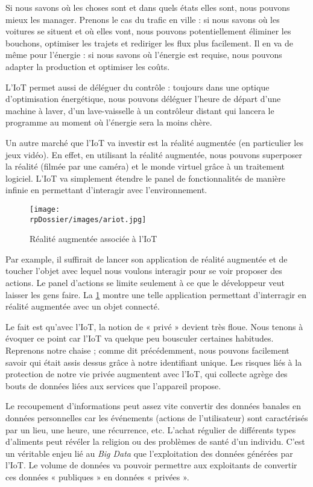 Si nous savons où les choses sont et dans quels états elles sont, nous pouvons mieux les manager. Prenons le cas du trafic en ville : si nous savons où les voitures se situent et où elles vont, nous pouvons potentiellement éliminer les bouchons, optimiser les trajets et rediriger les flux plus facilement. Il en va de même pour l'énergie : si nous savons où l'énergie est requise, nous pouvons adapter la production et optimiser les coûts.


L'IoT permet aussi de déléguer du contrôle : toujours dans une optique d'optimisation énergétique, nous pouvons déléguer l'heure de départ d'une machine à laver, d'un lave-vaisselle à un contrôleur distant qui lancera le programme au moment où l'énergie sera la moins chère.


Un autre marché que l'IoT va investir est la réalité augmentée (en particulier les jeux vidéo). En effet, en utilisant la réalité augmentée, nous pouvons superposer la réalité (filmée par une caméra) et le monde virtuel grâce à un traitement logiciel. L'IoT va simplement étendre le panel de fonctionnalités de manière infinie en permettant d'interagir avec l'environnement.

\begin{figure}[H]
\centering
\texttt{[image: \\rpDossier/images/ariot.jpg]}
\caption{Réalité augmentée associée à l’IoT}
\label{ariot}
\end{figure}

Par example, il suffirait de lancer son application de réalité augmentée et de toucher l'objet avec lequel nous voulons interagir pour se voir proposer des actions. Le panel d'actions se limite seulement à ce que le développeur veut laisser les gens faire. La \cref{ariot} montre une telle application permettant d’interragir en réalité augmentée avec un objet connecté.


Le fait est qu'avec l'IoT, la notion de « privé » devient très floue. Nous tenons à évoquer ce point car l'IoT va quelque peu bousculer certaines habitudes. Reprenons notre chaise ; comme dit précédemment, nous pouvons facilement savoir qui était assis dessus grâce à notre identifiant unique. Les risques liés à la protection de notre vie privée augmentent avec l'IoT, qui collecte agrège des bouts de données liées aux services que l'appareil propose.

Le recoupement d'informations peut assez vite convertir des données banales en données personnelles car les événements (actions de l'utilisateur) sont caractérisés par un lieu, une heure, une récurrence, etc. L'achat régulier de différents types d’aliments peut révéler la religion ou des problèmes de santé d’un individu. C'est un véritable enjeu lié au \emph{Big Data} que l'exploitation des données générées par l'IoT. Le volume de données va pouvoir permettre aux exploitants de convertir ces données « publiques » en données « privées ».

